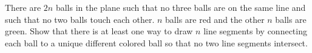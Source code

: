 There are $2n$ balls in the plane such that no three balls are on the same line
and such that no two balls touch each other. $n$ balls are red and the other
$n$ balls are green. Show that there is at least one way to draw $n$ line
segments by connecting each ball to a unique different colored ball so that no
two line segments intersect.
